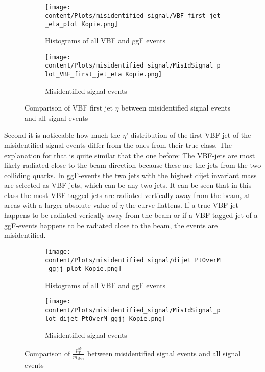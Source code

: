 \begin{figure}[H]
    \centering
    \begin{subfigure}{0.45\textwidth}
        \centering
        \texttt{[image: content/Plots/misidentified\_signal/VBF\_first\_jet\_eta\_plot Kopie.png]}
        \caption{Histograms of all VBF and ggF events}
        \label{fig:roc1}
    \end{subfigure}
    \hfill
    \begin{subfigure}{0.45\textwidth}
        \centering
        \texttt{[image: content/Plots/misidentified\_signal/MisIdSignal\_plot\_VBF\_first\_jet\_eta Kopie.png]}
        \caption{Misidentified signal events}
        \label{fig:roc2}
    \end{subfigure}
    \caption{Comparison of VBF first jet $\eta$ between misidentified signal events and all signal events}
    \label{fig:combined_roc}
\end{figure}

Second it is noticeable how much the $\eta$'-distribution of the first VBF-jet of the misidentified signal events differ from the ones from their true class. The explanation for that is quite similar that the one before:
The VBF-jets are most likely radiated close to the beam direction because these are the jets from the two colliding quarks. In ggF-events the two jets with the highest dijet invariant mass are
selected as VBF-jets, which can be any two jets. It can be seen that in this class the most VBF-tagged jets are radiated vertically away from the beam, at areas with a larger absolute value of $\eta$ the curve flattens.
If a true VBF-jet happens to be radiated verically away from the beam or if a VBF-tagged jet of a ggF-events happens to be radiated close to the beam, the events are misidentified.

\begin{figure}[H]
    \centering
    \begin{subfigure}{0.45\textwidth}
        \centering
        \texttt{[image: content/Plots/misidentified\_signal/dijet\_PtOverM\_ggjj\_plot Kopie.png]}
        \caption{Histograms of all VBF and ggF events}
        \label{fig:roc1}
    \end{subfigure}
    \hfill
    \begin{subfigure}{0.45\textwidth}
        \centering
        \texttt{[image: content/Plots/misidentified\_signal/MisIdSignal\_plot\_dijet\_PtOverM\_ggjj Kopie.png]}
        \caption{Misidentified signal events}
        \label{fig:roc2}
    \end{subfigure}
    \caption{Comparison of $\frac{p_T^{bb}}{m_{bb \gamma \gamma}}$ between misidentified signal events and all signal events}
    \label{fig:combined_roc}
\end{figure}

